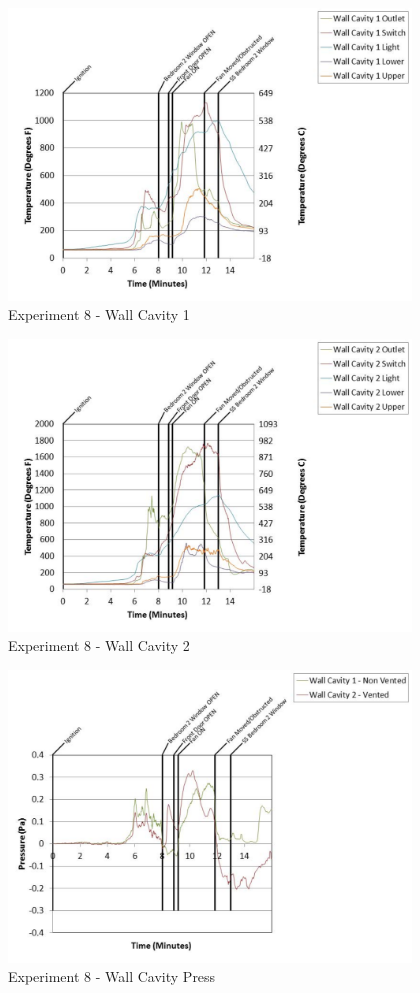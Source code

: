 \documentclass{article}
\begin{document}
\begin{appendices}
	\begin{figure}[h!]
		\centering
		\includegraphics[height=3.05in]{0_Images/Results_Charts/Exp_8_Charts/WallCavity1.pdf}
		\caption{Experiment 8 - Wall Cavity 1}
	\end{figure}
 
	\clearpage

	\begin{figure}[h!]
		\centering
		\includegraphics[height=3.05in]{0_Images/Results_Charts/Exp_8_Charts/WallCavity2.pdf}
		\caption{Experiment 8 - Wall Cavity 2}
	\end{figure}
 

	\begin{figure}[h!]
		\centering
		\includegraphics[height=3.05in]{0_Images/Results_Charts/Exp_8_Charts/WallCavityPress.pdf}
		\caption{Experiment 8 - Wall Cavity Press}
	\end{figure}
 

\end{appendices}
\end{document}
